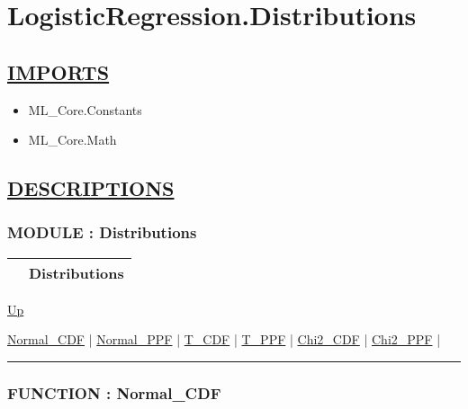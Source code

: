 \chapter*{LogisticRegression.Distributions}
\hypertarget{ecldoc:toc:LogisticRegression.Distributions}{}

\section*{\underline{IMPORTS}}
\begin{itemize}
\item ML\_Core.Constants
\item ML\_Core.Math
\end{itemize}

\section*{\underline{DESCRIPTIONS}}
\subsection*{MODULE : Distributions}
\hypertarget{ecldoc:LogisticRegression.Distributions}{}

{\renewcommand{\arraystretch}{1.5}
\begin{tabularx}{\textwidth}{|>{\raggedright\arraybackslash}l|X|}
\hline
\hspace{0pt} & Distributions \\
\hline
\end{tabularx}
}

\hyperlink{ecldoc:toc:LogisticRegression}{Up}

\par


\hyperlink{ecldoc:logisticregression.distributions.normal_cdf}{Normal\_CDF}  |
\hyperlink{ecldoc:logisticregression.distributions.normal_ppf}{Normal\_PPF}  |
\hyperlink{ecldoc:logisticregression.distributions.t_cdf}{T\_CDF}  |
\hyperlink{ecldoc:logisticregression.distributions.t_ppf}{T\_PPF}  |
\hyperlink{ecldoc:logisticregression.distributions.chi2_cdf}{Chi2\_CDF}  |
\hyperlink{ecldoc:logisticregression.distributions.chi2_ppf}{Chi2\_PPF}  |

\rule{\textwidth}{0.4pt}

\subsection*{FUNCTION : Normal\_CDF}
\hypertarget{ecldoc:logisticregression.distributions.normal_cdf}{}

